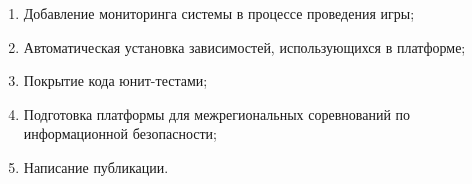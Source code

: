 \begin{enumerate}
\item Добавление мониторинга системы в процессе проведения игры;
\item Автоматическая установка зависимостей, использующихся в платформе;
\item Покрытие кода юнит-тестами;
\item Подготовка платформы для межрегиональных соревнований по информационной безопасности;
\item Написание публикации.
\end{enumerate}
